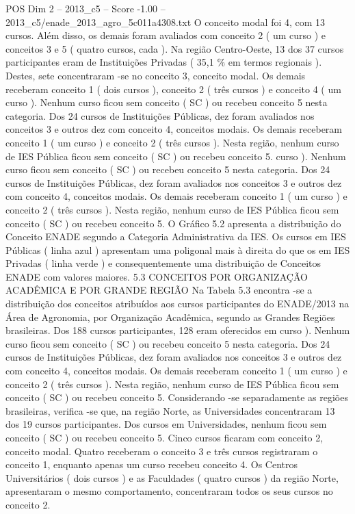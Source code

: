\begin{textsample}{POS Dim 2 – 2013\_c5 – Score -1.00 – 2013\_c5/enade\_2013\_agro\_5c011a4308.txt}
O conceito modal foi 4, com 13 cursos.
Além disso, os demais foram avaliados com conceito 2 ( um curso ) e conceitos 3 e 5 ( quatro cursos, cada ).
Na região Centro-Oeste, 13 dos 37 cursos participantes eram de Instituições Privadas ( 35,1 \% em termos regionais ).
Destes, sete concentraram -se no conceito 3, conceito modal.
Os demais receberam conceito 1 ( dois cursos ), conceito 2 ( três cursos ) e conceito 4 ( um curso ).
Nenhum curso ficou sem conceito ( SC ) ou recebeu conceito 5 nesta categoria.
Dos 24 cursos de Instituições Públicas, dez foram avaliados nos conceitos 3 e outros dez com conceito 4, conceitos modais.
Os demais receberam conceito 1 ( um curso ) e conceito 2 ( três cursos ).
Nesta região, nenhum curso de IES Pública ficou sem conceito ( SC ) ou recebeu conceito 5. curso ).
Nenhum curso ficou sem conceito ( SC ) ou recebeu conceito 5 nesta categoria.
Dos 24 cursos de Instituições Públicas, dez foram avaliados nos conceitos 3 e outros dez com conceito 4, conceitos modais.
Os demais receberam conceito 1 ( um curso ) e conceito 2 ( três cursos ).
Nesta região, nenhum curso de IES Pública ficou sem conceito ( SC ) ou recebeu conceito 5.
O Gráfico 5.2 apresenta a distribuição do Conceito ENADE segundo a Categoria Administrativa da IES.
Os cursos em IES Públicas ( linha azul ) apresentam uma poligonal mais à direita do que os em IES Privadas ( linha verde ) e consequentemente uma distribuição de Conceitos ENADE com valores maiores. 5.3 CONCEITOS POR ORGANIZAÇÃO ACADÊMICA E POR GRANDE REGIÃO Na Tabela 5.3 encontra -se a distribuição dos conceitos atribuídos aos cursos participantes do ENADE/2013 na Área de Agronomia, por Organização Acadêmica, segundo as Grandes Regiões brasileiras.
Dos 188 cursos participantes, 128 eram oferecidos em curso ).
Nenhum curso ficou sem conceito ( SC ) ou recebeu conceito 5 nesta categoria.
Dos 24 cursos de Instituições Públicas, dez foram avaliados nos conceitos 3 e outros dez com conceito 4, conceitos modais.
Os demais receberam conceito 1 ( um curso ) e conceito 2 ( três cursos ).
Nesta região, nenhum curso de IES Pública ficou sem conceito ( SC ) ou recebeu conceito 5.
Considerando -se separadamente as regiões brasileiras, verifica -se que, na região Norte, as Universidades concentraram 13 dos 19 cursos participantes.
Dos cursos em Universidades, nenhum ficou sem conceito ( SC ) ou recebeu conceito 5.
Cinco cursos ficaram com conceito 2, conceito modal.
Quatro receberam o conceito 3 e três cursos registraram o conceito 1, enquanto apenas um curso recebeu conceito 4.
Os Centros Universitários ( dois cursos ) e as Faculdades ( quatro cursos ) da região Norte, apresentaram o mesmo comportamento, concentraram todos os seus cursos no conceito 2.

\end{textsample}
